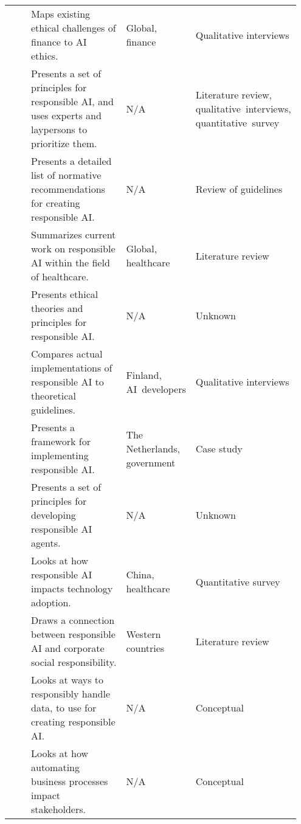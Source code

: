 \begin{landscape}
\begin{ThreePartTable}
\begin{longtable}{P{0.2\linewidth}P{0.45\linewidth}P{0.15\linewidth}P{0.15\linewidth}}
        \textcite{Rizinski_2022} & Maps existing ethical challenges of finance to AI ethics. & Global, finance & Qualitative interviews \\ 
        \textcite{Rothenberger_2019} & Presents a set of principles for responsible AI, and uses experts and laypersons to prioritize them. & N/A\tnote{*} & Literature review, \mbox{qualitative interviews}, \mbox{quantitative survey} \\ 
        \textcite{Ryan_2021} & Presents a detailed list of normative recommendations for creating \mbox{responsible} AI. & N/A\tnote{*} & Review of guidelines \\ 
        \textcite{Siala_2022} & Summarizes current work on responsible AI within the field of healthcare. & Global, healthcare & Literature review \\ 
        \textcite{Thelisson_2018} & Presents ethical theories and principles for responsible AI. & N/A\tnote{*} & Unknown\tnote{\textdagger} \\ 
        \textcite{Vakkuri_2022} & Compares actual implementations of responsible AI to theoretical guidelines. & Finland, \mbox{AI developers} & Qualitative interviews \\ 
        \textcite{vanBruxvoort_2021} & Presents a framework for implementing responsible AI. & The Netherlands, government & Case study \\ 
        \textcite{Vetro_2019} & Presents a set of principles for developing responsible AI agents. & N/A\tnote{*} & Unknown\tnote{\textdagger} \\ 
        \textcite{WangW_2021} & Looks at how responsible AI impacts technology adoption. & China, healthcare & Quantitative survey \\ 
        \textcite{WangY_2020} & Draws a connection between responsible AI and corporate social \mbox{responsibility}. & Western countries & Literature review \\ 
        \textcite{Werder_2022} & Looks at ways to responsibly handle data, to use for creating \mbox{responsible} AI. & N/A\tnote{*} & Conceptual \\ 
        \textcite{Wright_2018} & Looks at how automating business processes impact stakeholders. & N/A\tnote{*} & Conceptual \\ 
\end{longtable}

\end{ThreePartTable}

\normalsize

\end{landscape}